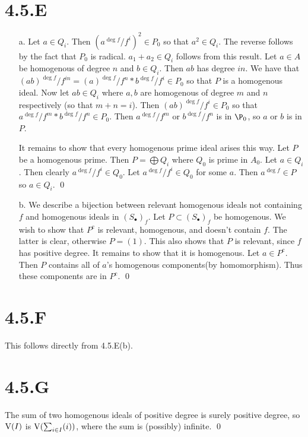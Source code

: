 \documentclass{article}
\begin{document}
\section{4.5.E}
\begin{itemize}
    \item[a.]
          Let $a \in Q_i$. Then $(a^{\deg f}/f^i)^2 \in P_0$ so that $a^2 \in Q_i$. The reverse follows by the fact that $P_0$ is radical. $a_1+a_2 \in Q_i$ follows from this result. Let $a \in A$ be homogenous of degree $n$ and $b \in Q_i$. Then $ab$ has degree $in$. We have that $(ab)^{\deg f}/f^{in}=(a)^{\deg f}/f^{n}*b^{\deg f}/f^{i} \in P_0$ so that $P$ is a homogenous ideal. Now let $ab \in Q_i$ where $a, b$ are homogenous of degree $m$ and $n$ respectively (so that $m+n=i$). Then $(ab)^{\deg f}/f^{i} \in P_0$ so that $a^{\deg f}/f^{m}*b^{\deg f}/f^{n} \in P_0$. Then $a^{\deg f}/f^{m}$ or $b^{\deg f}/f^{n}$ is in $\P_0$, so $a$ or $b$ is in $P$.

          It remains to show that every homogenous prime ideal arises this way. Let $P$ be a homogenous prime. Then $P=\bigoplus Q_i$ where $Q_0$ is prime in $A_0$. Let $a \in Q_i$. Then clearly $a^{\deg f}/f^{i} \in Q_0$. Let $a^{\deg f}/f^{i} \in Q_0$ for some $a$. Then $a^{\deg f} \in P$ so $a \in Q_i$. \qed

    \item[b.] We describe a bijection between relevant homogenous ideals not containing $f$ and homogenous ideals in $(S_{\bullet})_f$. Let $P \subset (S_{\bullet})_f$ be homogenous. We wish to show that $P^{\text{c}}$ is relevant, homogenous, and doesn't contain $f$. The latter is clear, otherwise $P=(1)$. This also shows that $P$ is relevant, since $f$ has positive degree. It remains to show that it is homogenous. Let $a \in P^{\text{c}}$. Then $P$ contains all of $a$'s homogenous components(by homomorphism). Thus these components are in $P^{\text{c}}$. \qed
\end{itemize}

\section{4.5.F}
This follows directly from 4.5.E(b).

\section{4.5.G}
The sum of two homogenous ideals of positive degree is surely positive degree, so $\operatorname{V}(I)$ is $\operatorname{V}(\sum_{i \in I} (i))$, where the sum is (possibly) infinite. \qed
\end{document}

